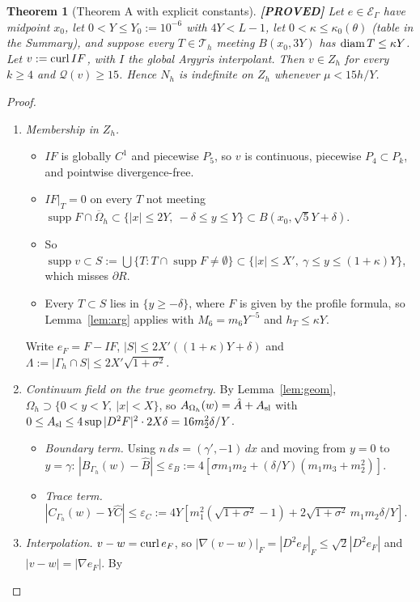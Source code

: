 \documentclass[11pt]{article}
\newtheorem{theorem}{Theorem}\newtheorem{lemma}[theorem]{Lemma}\newtheorem{corollary}[theorem]{Corollary}
\theoremstyle{remark}\newtheorem{remark}[theorem]{Remark}
\newcommand{\Oh}{\Omega_h}\newcommand{\Gh}{\Gamma_h}\newcommand{\hG}{h_\Gamma}\newcommand{\dn}{\partial_n}
\newcommand{\lab}[1]{\textbf{[#1]}}
\newcommand{\Th}{\mathcal T_h}\newcommand{\Zh}{Z_h}\newcommand{\VR}{V_h^R}\newcommand{\EG}{\mathcal E_\Gamma}
\begin{document}
\begin{theorem}[Theorem A with explicit constants]\label{thm:Aexp}\lab{PROVED}
Let $e\in\EG$ have midpoint $x_0$, let $0<Y\le Y_0:=10^{-6}$ with $4Y<L-1$, let $0<\kappa\le\kappa_0(\theta)$ (table in the
Summary), and suppose every $T\in\Th$ meeting $B(x_0,3Y)$ has $\operatorname{diam} T\le\kappa Y$. Let $v:=\operatorname{curl} I F$, with $I$ the global
Argyris interpolant. Then $v\in\Zh$ for every $k\ge4$ and $\mathcal Q(v)\ge15$. Hence $N_h$ is indefinite on $\Zh$ whenever
$\mu<15h/Y$.
\end{theorem}
\begin{proof}
\begin{enumerate}[label=\arabic*.]
\item \emph{Membership in $\Zh$.}
 \begin{itemize}
 \item $IF$ is globally $C^1$ and piecewise $P_5$, so $v$ is continuous, piecewise $P_4\subset P_k$, and pointwise
 divergence-free.
 \item $IF|_T=0$ on every $T$ not meeting $\operatorname{supp}F\cap\overline\Oh\subset\{|x|\le2Y,\ -\delta\le y\le Y\}\subset B(x_0,\sqrt5Y+\delta)$.
 \item So $\operatorname{supp}v\subset S:=\bigcup\{T:T\cap\operatorname{supp}F\ne\emptyset\}\subset\{|x|\le X',\ \gamma\le y\le(1+\kappa)Y\}$,
 which misses $\partial R$.
 \item Every $T\subset S$ lies in $\{y\ge-\delta\}$, where $F$ is given by the profile formula, so Lemma~\ref{lem:arg} applies
 with $M_6=m_6Y^{-5}$ and $h_T\le\kappa Y$.
 \end{itemize}
 Write $e_F=F-IF$, $|S|\le2X'((1+\kappa)Y+\delta)$ and $\Lambda:=|\Gh\cap S|\le2X'\sqrt{1+\sigma^2}$.
\item \emph{Continuum field on the true geometry.} By Lemma~\ref{lem:geom}, $\Oh\supset\{0<y<Y,\ |x|<X\}$, so
$A_{\Oh}(w)=\hat A+A_{\rm sl}$ with $0\le A_{\rm sl}\le4\sup|D^2F|^2\cdot2X\delta=16m_2^2\delta/Y$.
 \begin{itemize}
 \item \emph{Boundary term.} Using $n\,ds=(\gamma',-1)\,dx$ and moving from $y=0$ to $y=\gamma$:
 $|B_{\Gh}(w)-\hat B|\le\varepsilon_B:=4[\sigma m_1m_2+(\delta/Y)(m_1m_3+m_2^2)]$.
 \item \emph{Trace term.} $|C_{\Gh}(w)-Y\hat C|\le\varepsilon_C:=4Y[m_1^2(\sqrt{1+\sigma^2}-1)+2\sqrt{1+\sigma^2}\,m_1m_2\delta/Y]$.
 \end{itemize}
\item \emph{Interpolation.} $v-w=\operatorname{curl} e_F$, so $|\nabla(v-w)|_F=|D^2e_F|_F\le\sqrt2|D^2e_F|$ and $|v-w|=|\nabla e_F|$. By

\end{enumerate}
\end{proof}
\end{document}
